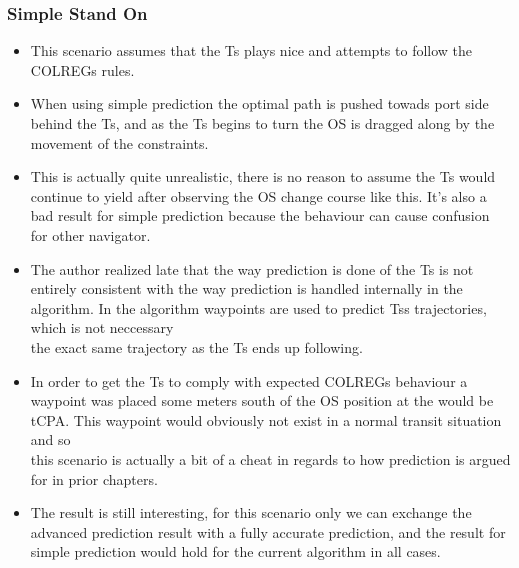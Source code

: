 \subsubsection{Simple Stand On}
\begin{itemize}
    \item This scenario assumes that the \gls{Ts} plays nice and attempts to follow the \gls{COLREGs} rules.
    \item When using simple prediction the optimal path is pushed towads port side behind the \gls{Ts}, and as the \gls{Ts} begins to turn the \gls{OS} is dragged along by the movement of the constraints.
    \item This is actually quite unrealistic, there is no reason to assume the \gls{Ts} would continue to yield after observing the \gls{OS} change course like this. It's also a bad result for simple prediction because the behaviour can cause confusion\\
    for other navigator.
    \item The author realized late that the way prediction is done of the \gls{Ts} is not entirely consistent with the way prediction is handled internally in the algorithm. In the algorithm waypoints are used to predict \gls{Ts}s trajectories, which is not neccessary\\
    the exact same trajectory as the \gls{Ts} ends up following. 
    \item In order to get the \gls{Ts} to comply with expected \gls{COLREGs} behaviour a waypoint was placed some meters south of the \gls{OS} position at the would be \gls{tCPA}. This waypoint would obviously not exist in a normal transit situation and so\\
    this scenario is actually a bit of a cheat in regards to how prediction is argued for in prior chapters.
    \item The result is still interesting, for this scenario only we can exchange the advanced prediction result with a fully accurate prediction, and the result for simple prediction would hold for the current algorithm in all cases.
\end{itemize}

